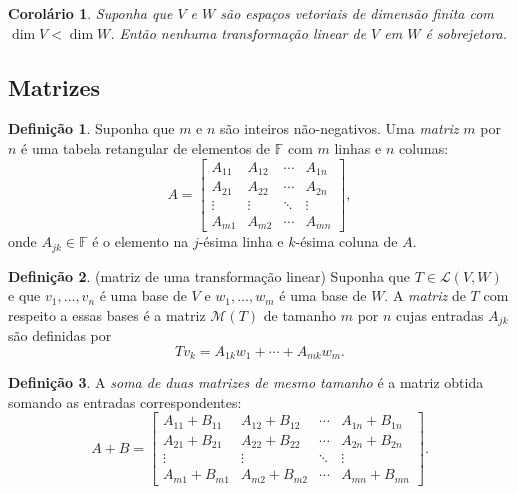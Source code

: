 \documentclass[12pt]{article}
\theoremstyle{plain}
\newtheorem{cor}[thm]{Corolário}
\theoremstyle{definition}
\newtheorem{defn}{Definição}[section]
\theoremstyle{remark}
\begin{document}
\begin{cor}
    Suponha que \(V\) e \(W\) são espaços vetoriais de dimensão finita com \(\dim V < \dim W\). Então nenhuma transformação linear de \(V\) em \(W\) é sobrejetora.
\end{cor}

\subsection{Matrizes}
\begin{defn}
    Suponha que \(m\) e \(n\) são inteiros não-negativos. Uma \emph{matriz} \(m\) por \(n\) é uma tabela retangular de elementos de \(\mathbb{F}\) com \(m\) linhas e \(n\) colunas:
    \[
        A = \begin{bmatrix}
            A_{11} & A_{12} & \cdots & A_{1n} \\
            A_{21} & A_{22} & \cdots & A_{2n} \\
            \vdots & \vdots & \ddots & \vdots \\
            A_{m1} & A_{m2} & \cdots & A_{mn}
        \end{bmatrix},
    \]
    \noindent onde \(A_{jk} \in \mathbb{F}\) é o elemento na \(j\)-ésima linha e \(k\)-ésima coluna de \(A\).
\end{defn}

\begin{defn} (matriz de uma transformação linear)
    Suponha que \(T \in \mathcal{L}(V, W)\) e que \(v_1, \ldots, v_n\) é uma base de \(V\) e \(w_1, \ldots, w_m\) é uma base de \(W\). A \emph{matriz} de \(T\) com respeito a essas bases é a matriz \(\mathcal{M}(T)\) de tamanho \(m\) por \(n\) cujas entradas \(A_{jk}\) são definidas por
    \[
        Tv_k = A_{1k} w_1 + \cdots + A_{mk} w_m.
    \]    
\end{defn}

\begin{defn}
    A \emph{soma de duas matrizes de mesmo tamanho} é a matriz obtida somando as entradas correspondentes:
    \[
        A + B = \begin{bmatrix}
            A_{11} + B_{11} & A_{12} + B_{12} & \cdots & A_{1n} + B_{1n} \\
            A_{21} + B_{21} & A_{22} + B_{22} & \cdots & A_{2n} + B_{2n} \\
            \vdots & \vdots & \ddots & \vdots \\
            A_{m1} + B_{m1} & A_{m2} + B_{m2} & \cdots & A_{mn} + B_{mn}
        \end{bmatrix}.
    \]
\end{defn}
\end{document}
